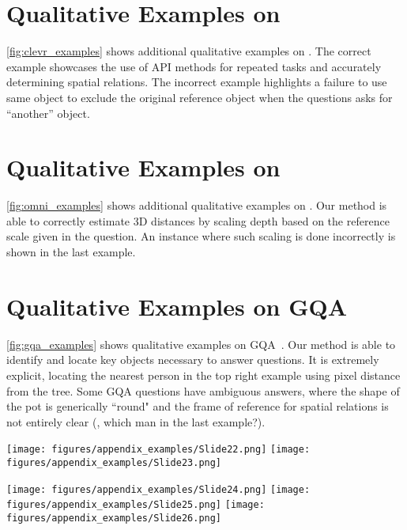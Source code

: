\section{Qualitative Examples on \clevr}

\cref{fig:clevr_examples} shows additional qualitative examples on \clevr. The correct example showcases the use of API methods for repeated tasks and accurately determining spatial relations. The incorrect example highlights a failure to use same object to exclude the original reference object when the questions asks for ``another'' object.

\section{Qualitative Examples on \ourbench}

\cref{fig:omni_examples} shows additional qualitative examples on \ourbench. Our method is able to correctly estimate 3D distances by scaling depth based on the reference scale given in the question. An instance where such scaling is done incorrectly is shown in the last example. 

\section{Qualitative Examples on GQA}

\cref{fig:gqa_examples} shows qualitative examples on GQA~\cite{gqa}. Our method is able to identify and locate key objects necessary to answer questions. It is extremely explicit, locating the nearest person in the top right example using pixel distance from the tree. Some GQA questions have ambiguous answers, where the shape of the pot is generically ``round" and the frame of reference for spatial relations is not entirely clear (\ie, which man in the last example?).  


\begin{figure*}[!ht]
    \centering
    \texttt{[image: figures/appendix\_examples/Slide22.png]}
    \texttt{[image: figures/appendix\_examples/Slide23.png]}
    \vspace{-2mm}
    \caption{\method program outputs on \clevr.}
    \label{fig:clevr_examples}
    \vspace{-2mm}
\end{figure*}

\begin{figure*}[!ht]
    \centering
    \texttt{[image: figures/appendix\_examples/Slide24.png]}
    \texttt{[image: figures/appendix\_examples/Slide25.png]}
    \texttt{[image: figures/appendix\_examples/Slide26.png]}
    \vspace{-2mm}
    \caption{\method program outputs on \ourbench.}
    \label{fig:omni_examples}
    \vspace{-2mm}
\end{figure*}

